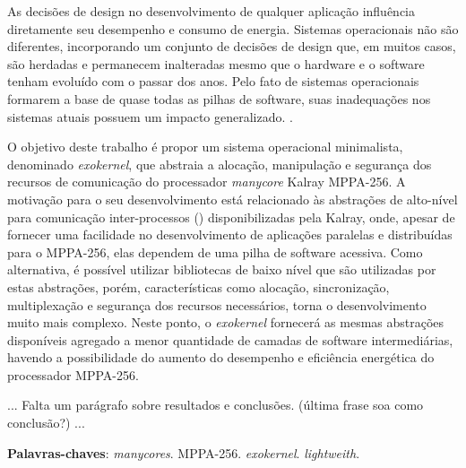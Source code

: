 \documentclass[
	12pt,				%
	openright,			%
	twoside,			%
	a4paper,			%
	english,			%
	brazil,				%
	]{abntex2}
\begin{document}
\begin{resumo}

As decisões de design no desenvolvimento de qualquer aplicação influência diretamente seu desempenho e consumo de energia.
Sistemas operacionais não são diferentes, incorporando um conjunto de decisões de design que, em muitos casos, são herdadas e permanecem inalteradas mesmo que o hardware e o software tenham evoluído com o passar dos anos.
Pelo fato de sistemas operacionais formarem a base de quase todas as pilhas de software, suas inadequações nos sistemas atuais possuem um impacto generalizado. \cite{hunt_singularity:_2007}. 

O objetivo deste trabalho é propor um sistema operacional minimalista, denominado \textit{exokernel}, que abstraia a alocação, manipulação e segurança dos recursos de comunicação do processador \textit{manycore} Kalray MPPA-256.
A motivação para o seu desenvolvimento está relacionado às abstrações de alto-nível para comunicação inter-processos (\ipc) disponibilizadas pela Kalray, onde, apesar de fornecer uma facilidade no desenvolvimento de aplicações paralelas e distribuídas para o MPPA-256, elas dependem de uma pilha de software acessiva.
Como alternativa, é possível utilizar bibliotecas de baixo nível que são utilizadas por estas abstrações, porém, características como alocação, sincronização, multiplexação e segurança dos recursos necessários, torna o desenvolvimento muito mais complexo.
Neste ponto, o \textit{exokernel} fornecerá as mesmas abstrações \ipc disponíveis agregado a menor quantidade de camadas de software intermediárias, havendo a possibilidade do aumento do desempenho e eficiência energética do processador MPPA-256.

... Falta um parágrafo sobre resultados e conclusões. (última frase soa como conclusão?) ...

 \vspace{\onelineskip}
    
 \noindent
 \textbf{Palavras-chaves}: \textit{manycores}. MPPA-256. \textit{exokernel}. \textit{lightweith}.
\end{resumo}


 
\end{document}
